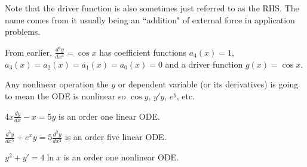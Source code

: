 \documentclass[notes.tex]{subfiles}
\begin{document}
Note that the driver function is also sometimes just referred to as the RHS. The name comes from it usually being an ``addition" of external force in application problems.

\begin{example}
    From earlier, $\frac{d^4 y}{dx^4} = \cos x$ has coefficient functions $a_4(x) = 1$, $a_3(x) = a_2(x) = a_1(x) = a_0(x) = 0$ and a driver function $g(x) = \cos x$.
\end{example}

Any nonlinear operation the $y$ or dependent variable (or its derivatives) is going to mean the ODE is nonlinear so $\cos y$, $y' y$, $e^y$, etc.

\begin{example}
    $4x \frac{dy}{dx} - x = 5y$ is an order one linear ODE.
\end{example}
\begin{example}
    $\frac{d^5y}{dx^5} + e^x y = 5\frac{d^2 y}{dx^2}$ is an order five linear ODE.
\end{example}
\begin{example}
    $y^2 + y' = 4\ln x$ is an order one nonlinear ODE.
\end{example}
\end{document}
